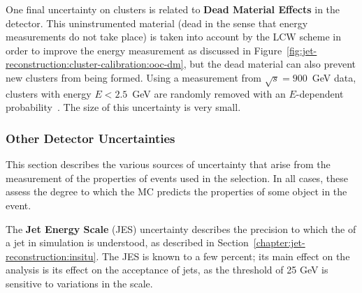 


	One final uncertainty on clusters is related to \textbf{Dead Material Effects} in the detector. This uninstrumented material (dead in the sense that energy measurements do not take place) is taken into account by the LCW scheme in order to improve the energy measurement as discussed in Figure~\ref{fig:jet-reconstruction:cluster-calibration:ooc-dm}, but the dead material can also prevent new clusters from being formed. Using a measurement from $\sqrt{s} = 900$~GeV data, clusters with energy $E < 2.5$~GeV  are randomly removed with an $E$-dependent probability~\cite{Aad:2012vm}. The size of this uncertainty is very small.

	\subsubsection{Other Detector Uncertainties}
	\label{chapter:color:uncertainties:other}

	This section describes the various sources of uncertainty that arise from the measurement of the properties of events used in the selection. In all cases, these assess the degree to which the MC predicts the properties of some object in the event.

	The \textbf{Jet Energy Scale} (JES) uncertainty describes the precision to which the \pt of a jet in simulation is understood, as described in Section~\ref{chapter:jet-reconstruction:insitu}. The JES is known to a few percent; its main effect on the analysis is its effect on the acceptance of jets, as the \pt threshold of 25 GeV is sensitive to variations in the \pt scale.



